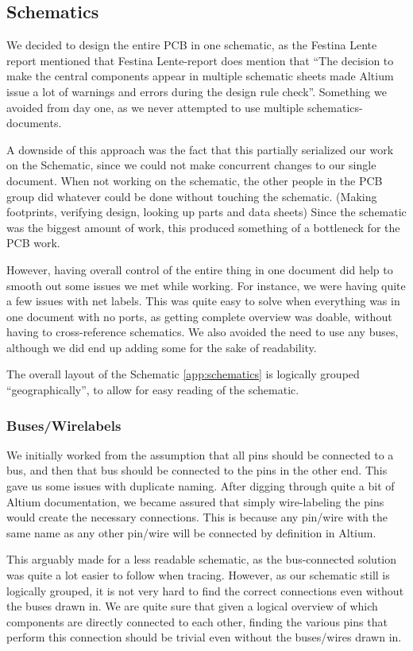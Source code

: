 \subsection {Schematics}

We decided to design the entire \ac{PCB} in one schematic, as the Festina Lente
report mentioned that Festina Lente-report does mention that 
``The decision to make the central components appear in multiple schematic
sheets made Altium issue a lot of warnings and errors during the design rule 
check''\cite[p.~49]{berg2011festinalente}. Something we avoided from day one, 
as we never attempted to use multiple schematics-documents.

A downside of this approach was the fact that this partially serialized
our work on the Schematic, since we could not make concurrent changes to our
single document. When not working on the schematic, the other people in the
\ac{PCB} group did whatever could be done without touching the
schematic. (Making footprints, verifying design, looking up parts and data
sheets) Since the schematic was the biggest amount of work, this produced
something of a bottleneck for the PCB work.

However, having overall control of the entire thing in one document
did help to smooth out some issues we met while working. For instance,
we were having quite a few issues with net labels. This was quite easy to
solve when everything was in one document with no ports, as getting
complete overview was doable, without having to cross-reference schematics.
We also avoided the need to use any buses, although we did end up adding
some for the sake of readability.

The overall layout of the Schematic \ref{app:schematics} is logically grouped ``geographically'', to
allow for easy reading of the schematic.

\subsubsection {Buses/Wirelabels}
We initially worked from the assumption that all pins should be connected to a
bus, and then that bus should be connected to the pins in the other end. This
gave us some issues with duplicate naming. After digging through quite a bit of
Altium documentation, we became assured that simply wire-labeling the pins
would create the necessary connections. This is because any pin/wire with the
same name as any other pin/wire will be connected by definition in Altium.

This arguably made for a less readable schematic, as the bus-connected solution
was quite a lot easier to follow when tracing. However, as our schematic still
is logically grouped, it is not very hard to find the correct connections even
without the buses drawn in. We are quite sure that given a logical overview of
which components are directly connected to each other, finding the various pins
that perform this connection should be trivial even without the buses/wires
drawn in.

